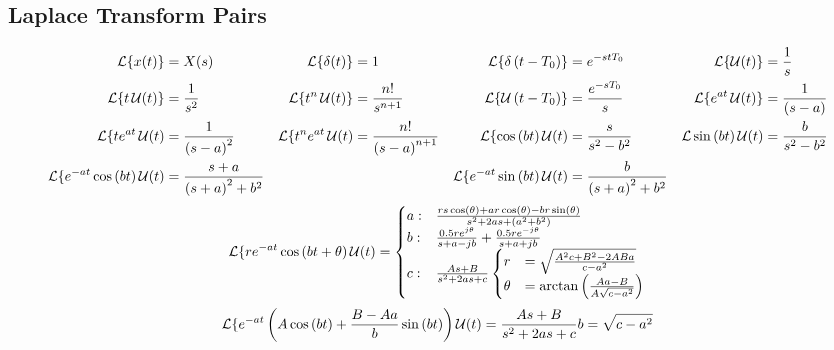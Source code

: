 	\subsection*{Laplace Transform Pairs} \label{subsec:Laplace Transform Pairs}
		\begin{align*}
			\operatorname{\mathcal{L}} \lbrace x (t) \rbrace &= X(s) & \operatorname{\mathcal{L}} \lbrace \delta (t) \rbrace &= 1 & \operatorname{\mathcal{L}} \lbrace \delta \left( t-T_{0} \right) \rbrace &= e^{-stT_{0}} & \operatorname{\mathcal{L}} \lbrace \operatorname{\mathcal{U}} (t) \rbrace &= \frac{1}{s} \\
			\operatorname{\mathcal{L}} \lbrace t \operatorname{\mathcal{U}} (t) \rbrace &= \frac{1}{s^{2}} & \operatorname{\mathcal{L}} \lbrace t^{n}\operatorname{\mathcal{U}} (t) \rbrace &= \frac{n!}{s^{n+1}} & \operatorname{\mathcal{L}} \lbrace \operatorname{\mathcal{U}} \left( t-T_{0} \right) \rbrace &= \frac{e^{-sT_{0}}}{s} & \operatorname{\mathcal{L}} \lbrace e^{at} \operatorname{\mathcal{U}} (t) \rbrace &= \frac{1}{\left( s-a \right)} \\
			\operatorname{\mathcal{L}} \lbrace t e^{at} \operatorname{\mathcal{U}} (t) &= \frac{1}{\left( s-a \right)^{2}} & \operatorname{\mathcal{L}} \lbrace t^{n} e^{at} \operatorname{\mathcal{U}} (t) &= \frac{n!}{\left( s-a \right)^{n+1}} & \operatorname{\mathcal{L}} \lbrace \cos \left( bt \right) \operatorname{\mathcal{U}} (t) &= \frac{s}{s^{2}-b^{2}} & \operatorname{\mathcal{L}} \sin \left( bt \right) \operatorname{\mathcal{U}} (t) &= \frac{b}{s^{2}-b^{2}} \\
			\operatorname{\mathcal{L}} \lbrace e^{-at} \cos \left( bt \right) \operatorname{\mathcal{U}} (t) &= \frac{s+a}{\left( s+a \right)^{2} + b^{2}} &&& \operatorname{\mathcal{L}} \lbrace e^{-at} \sin \left( bt \right) \operatorname{\mathcal{U}} (t) &= \frac{b}{\left( s+a \right)^{2} + b^{2}} \\
		\end{align*}
		\begin{equation*}
			\operatorname{\mathcal{L}} \lbrace r e^{-at} \cos \left( bt + \theta \right) \operatorname{\mathcal{U}} (t) =
				\begin{cases}
					a: & \frac{rs \cos \left( \theta \right) + ar \cos \left( \theta \right) - br \sin \left( \theta \right)}{s^{2} + 2as + \left( a^{2} + b^{2} \right)} \\
					b: & \frac{0.5 re^{j \theta}}{s+a-jb} + \frac{0.5 re^{-j \theta}}{s+a+jb} \\
					c: & \frac{As+B}{s^{2} + 2as + c}
						\begin{cases}
							r &=\sqrt{\frac{A^{2}c + B^{2} -2ABa}{c-a^{2}}} \\
							\theta &= \arctan \left( \frac{Aa-B}{A \sqrt{c-a^{2}}} \right)
						\end{cases} \\
				\end{cases}
		\end{equation*}
		\begin{equation*}
			\operatorname{\mathcal{L}} \lbrace e^{-at} \left( A \cos \left( bt \right) + \frac{B-Aa}{b} \sin \left( bt \right) \right) \operatorname{\mathcal{U}} (t) = \frac{As+B}{s^{2} + 2as + c} \\
			b = \sqrt{c-a^{2}}
		\end{equation*}